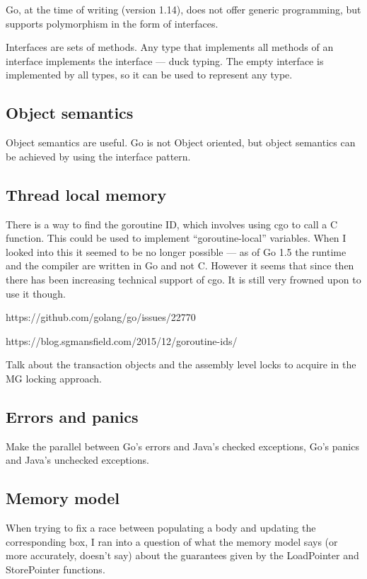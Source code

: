 \documentclass[12pt,a4paper,oneside,openright]{report}
\begin{document}
Go, at the time of writing (version 1.14), does not offer generic
programming, but supports polymorphism in the form of interfaces.

Interfaces are sets of methods. Any type that implements all methods
of an interface implements the interface --- duck typing. The empty
interface is implemented by all types, so it can be used to represent
any type.

\subsection{Object semantics}
\label{sec:prep:oop}

Object semantics are useful. Go is not Object oriented, but object
semantics can be achieved by using the interface pattern.

\subsection{Thread local memory}
\label{sec:prep:thread-locals}

There is a way to find the goroutine ID, which involves using cgo to
call a C function. This could be used to implement ``goroutine-local''
variables. When I looked into this it seemed to be no longer possible
--- as of Go 1.5 the runtime and the compiler are written in Go and
not C. However it seems that since then there has been increasing
technical support of cgo. It is still very frowned upon to use it
though.

https://github.com/golang/go/issues/22770

https://blog.sgmansfield.com/2015/12/goroutine-ids/

Talk about the transaction objects and the assembly level locks to
acquire in the MG locking approach.

\subsection{Errors and panics}
\label{sec:prep:panics-errors}

Make the parallel between Go's errors and Java's checked exceptions,
Go's panics and Java's unchecked exceptions.

\subsection{Memory model}
\label{sec:prep:memory-model}

When trying to fix a race between populating a body and updating the
corresponding box, I ran into a question of what the memory model says
(or more accurately, doesn't say) about the guarantees given by the
LoadPointer and StorePointer functions.
\end{document}
